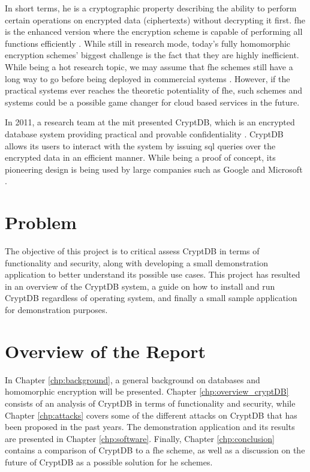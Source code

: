 In short terms, \gls{he} is a cryptographic property describing the ability to perform certain operations on encrypted data (ciphertexts) without decrypting it first. \gls{fhe} is the enhanced version where the encryption scheme is capable of performing all functions efficiently \cite{Gentry_thesis}. While still in research mode, today's fully homomorphic encryption schemes' biggest challenge is the fact that they are highly inefficient. While being a hot research topic, we may assume that \gls{fhe} schemes still have a long way to go before being deployed in commercial systems \cite{naehrig2011can}. However, if the practical systems ever reaches the theoretic potentiality of \gls{fhe}, such schemes and systems could be a possible game changer for cloud based services in the future.

In 2011, a research team at the \gls{mit} presented CryptDB, which is an encrypted database system providing practical and provable confidentiality \cite{CryptDB_Main_Paper}. CryptDB allows its users to interact with the system by issuing \gls{sql} queries over the encrypted data in an efficient manner. While being a proof of concept, its pioneering design is being used by large companies such as Google and Microsoft \cite{cryptdb_homepage}.

\section{Problem}

The objective of this project is to critical assess CryptDB in terms of functionality and security, along with developing a small demonstration application to better understand its possible use cases. This project has resulted in an overview of the CryptDB system, a guide on how to install and run CryptDB regardless of operating system, and finally a small sample application for demonstration purposes.

\section{Overview of the Report}

In Chapter \ref{chp:background}, a general background on databases and homomorphic encryption will be presented. Chapter \ref{chp:overview_cryptDB} consists of an analysis of CryptDB in terms of functionality and security, while Chapter \ref{chp:attacks} covers some of the different attacks on CryptDB that has been proposed in the past years. The demonstration application and its results are presented in Chapter \ref{chp:software}. Finally, Chapter \ref{chp:conclusion} contains a comparison of CryptDB to a \gls{fhe} scheme, as well as a discussion on the future of CryptDB as a possible solution for \gls{he} schemes.